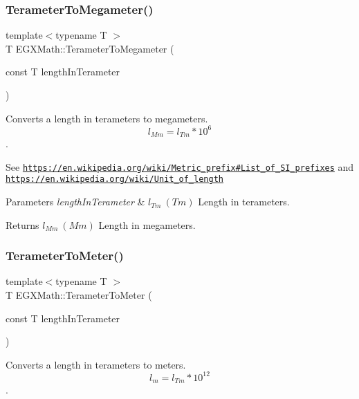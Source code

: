 \subsubsection{\texorpdfstring{Terameter\+To\+Megameter()}{TerameterToMegameter()}}
{\footnotesize\ttfamily template$<$typename T $>$ \\
T E\+G\+X\+Math\+::\+Terameter\+To\+Megameter (\begin{DoxyParamCaption}\item[{const T}]{length\+In\+Terameter }\end{DoxyParamCaption})}



Converts a length in terameters to megameters. \[ l_{Mm}=l_{Tm} * 10^{6} \]. 

See \href{https://en.wikipedia.org/wiki/Metric_prefix#List_of_SI_prefixes}{\tt https\+://en.\+wikipedia.\+org/wiki/\+Metric\+\_\+prefix\#\+List\+\_\+of\+\_\+\+S\+I\+\_\+prefixes} and \href{https://en.wikipedia.org/wiki/Unit_of_length}{\tt https\+://en.\+wikipedia.\+org/wiki/\+Unit\+\_\+of\+\_\+length} 
\begin{DoxyParams}{Parameters}
{\em length\+In\+Terameter} & $ l_{Tm}\ (Tm)$ Length in terameters. \\
\hline
\end{DoxyParams}
\begin{DoxyReturn}{Returns}
$ l_{Mm}\ (Mm)$ Length in megameters. 
\end{DoxyReturn}
\mbox{\label{group___e_g_x_math-_conversions-_length_conversions-_s_i-_terameter-_s_i_ga34f2674bfcf8fb79eda27adf607d0876}} 
\subsubsection{\texorpdfstring{Terameter\+To\+Meter()}{TerameterToMeter()}}
{\footnotesize\ttfamily template$<$typename T $>$ \\
T E\+G\+X\+Math\+::\+Terameter\+To\+Meter (\begin{DoxyParamCaption}\item[{const T}]{length\+In\+Terameter }\end{DoxyParamCaption})}



Converts a length in terameters to meters. \[ l_{m}=l_{Tm} * 10^{12} \]. 


